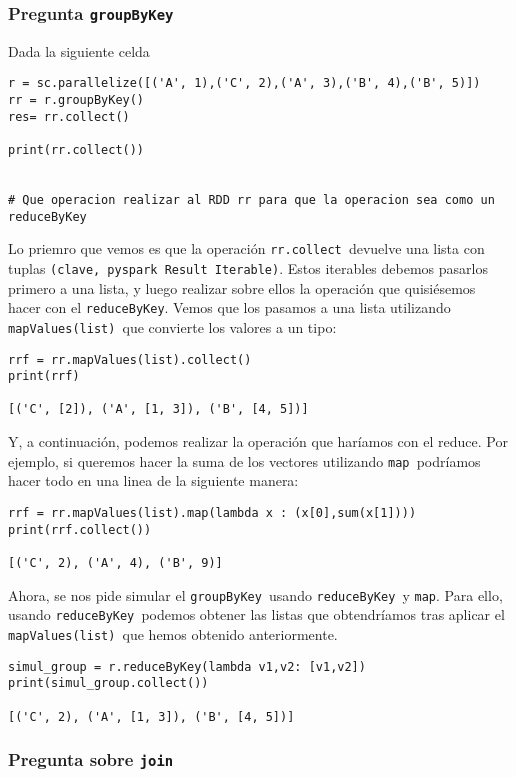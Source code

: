 \documentclass[11pt]{article}
\def\inline{\lstinline[basicstyle=\ttfamily,keywordstyle={}]}
\begin{document}
{{\subsubsection*{ Pregunta  \inline{groupByKey}}

Dada la siguiente celda
\begin{verbatim}
r = sc.parallelize([('A', 1),('C', 2),('A', 3),('B', 4),('B', 5)])
rr = r.groupByKey()
res= rr.collect()

print(rr.collect())


# Que operacion realizar al RDD rr para que la operacion sea como un reduceByKey
\end{verbatim}

Lo priemro que vemos es que la operación \inline{rr.collect }devuelve una lista con tuplas  \inline{(clave, pyspark Result Iterable)}. Estos iterables debemos pasarlos primero a una lista, y luego realizar sobre ellos la operación que quisiésemos hacer con el  \inline{reduceByKey}. Vemos que los pasamos a una lista utilizando \inline{mapValues(list) }que convierte los valores a un tipo:

\begin{verbatim}
rrf = rr.mapValues(list).collect()
print(rrf)

[('C', [2]), ('A', [1, 3]), ('B', [4, 5])]
\end{verbatim}

Y, a continuación, podemos realizar la operación que haríamos con el reduce. Por ejemplo, si queremos hacer la suma de los vectores utilizando \inline{map }podríamos hacer todo en una linea de la siguiente manera:
\begin{verbatim}
rrf = rr.mapValues(list).map(lambda x : (x[0],sum(x[1])))
print(rrf.collect())

[('C', 2), ('A', 4), ('B', 9)]
\end{verbatim}

Ahora, se nos pide simular el \inline{groupByKey }usando \inline{reduceByKey }y  \inline{map}. Para ello, usando \inline{reduceByKey }podemos obtener las listas que obtendríamos tras aplicar el \inline{mapValues(list) }que hemos obtenido anteriormente.
\begin{verbatim}
simul_group = r.reduceByKey(lambda v1,v2: [v1,v2])
print(simul_group.collect())

[('C', 2), ('A', [1, 3]), ('B', [4, 5])]
\end{verbatim}

\subsubsection*{ Pregunta sobre  \inline{join}}

}}
\end{document}
